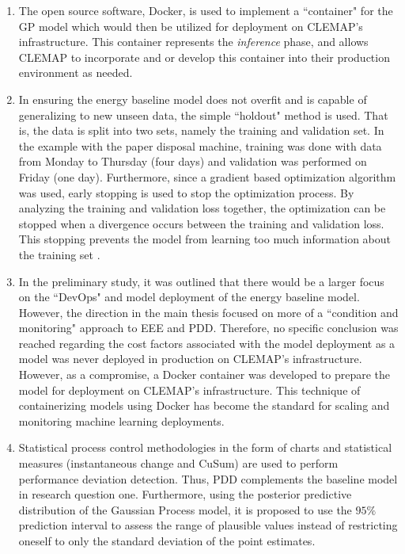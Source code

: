 \begin{enumerate}
    \item The open source software, Docker, is used to implement a ``container" for the GP model which would then be utilized for deployment on CLEMAP's infrastructure. This container represents the \textit{inference} phase, and allows CLEMAP to incorporate and or develop this container into their production environment as needed.  
    
    \item In ensuring the energy baseline model does not overfit and is capable of generalizing to new unseen data, the simple ``holdout" method is used. That is, the data is split into two sets, namely the training and validation set. In the example with the paper disposal machine, training was done with data from Monday to Thursday (four days) and validation was performed on Friday (one day). Furthermore, since a gradient based optimization algorithm was used, early stopping is used to stop the optimization process. By analyzing the training and validation loss together, the optimization can be stopped when a divergence occurs between the training and validation loss. This stopping prevents the model from learning too much information about the training set \cite{pml1Book}. 
    
    \item In the preliminary study, it was outlined that there would be a larger focus on the ``DevOps" and model deployment of the energy baseline model. However, the direction in the main thesis focused on more of a ``condition and monitoring" approach to EEE and PDD. Therefore, no specific conclusion was reached regarding the cost factors associated with the model deployment as a model was never deployed in production on CLEMAP's infrastructure. However, as a compromise, a Docker container was developed to prepare the model for deployment on CLEMAP's infrastructure. This technique of containerizing models using Docker has become the standard for scaling and monitoring machine learning deployments. 
    
    \item Statistical process control methodologies in the form of charts and statistical measures (instantaneous change and CuSum) are used to perform performance deviation detection. Thus, PDD complements the baseline model in research question one. Furthermore, using the posterior predictive distribution of the Gaussian Process model, it is proposed to use the $95\%$ prediction interval to assess the range of plausible values instead of restricting oneself to only the standard deviation of the point estimates.  
    

\end{enumerate}
